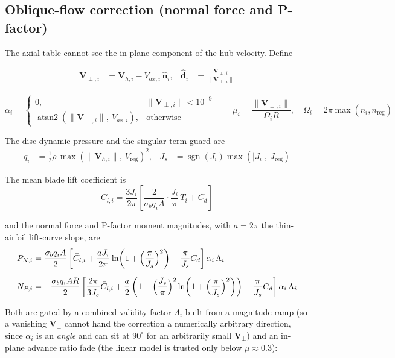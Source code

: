 \documentclass[11pt,a4paper]{article}
\newcommand{\vect}[1]{\bm{#1}}
\newcommand{\unit}[1]{\hat{\bm{#1}}}
\newcommand{\sgn}{\operatorname{sgn}}
\newcommand{\atantwo}{\operatorname{atan2}}
\begin{document}
\subsection{Oblique-flow correction (normal force and P-factor)}
The axial table cannot see the in-plane component of the hub velocity. Define

\begin{align}
\vect V_{\perp,i}&=\vect V_{h,i}-V_{ax,i}\,\unit n_i, &
\unit d_i&=\frac{\vect V_{\perp,i}}{\lVert\vect V_{\perp,i}\rVert}
\end{align}

\begin{equation}
\alpha_i=
\begin{cases}
0, & \lVert\vect V_{\perp,i}\rVert<10^{-9}\\[1mm]
\atantwo\!\left(\lVert\vect V_{\perp,i}\rVert,\ V_{ax,i}\right), & \text{otherwise}
\end{cases}
\qquad
\mu_i=\frac{\lVert\vect V_{\perp,i}\rVert}{\Omega_i R},
\quad \Omega_i=2\pi\max(n_i,n_{\mathrm{reg}})
\end{equation}

The disc dynamic pressure and the singular-term guard are
\begin{align}
q_i&=\tfrac12\rho\,\max\!\left(\lVert\vect V_{h,i}\rVert,\ V_{\!\mathrm{reg}}\right)^{2}, &
J_{s}&=\sgn(J_i)\max\!\left(|J_i|,\ J_{\mathrm{reg}}\right)
\end{align}

The mean blade lift coefficient is
\begin{equation}
\bar C_{l,i}=\frac{3J_i}{2\pi}
\left[\frac{2}{\sigma_b q_i A}\cdot\frac{J_i}{\pi}\,T_i+C_{d}\right]
\end{equation}

and the normal force and P-factor moment magnitudes, with $a=2\pi$ the
thin-airfoil lift-curve slope, are
\begin{align}
P_{N,i}&=\frac{\sigma_b q_i A}{2}
\left[\bar C_{l,i}
+\frac{a J_i}{2\pi}\ln\!\left(1+\Bigl(\frac{\pi}{J_{s}}\Bigr)^{2}\right)
+\frac{\pi}{J_{s}}C_{d}\right]\alpha_i\,\Lambda_i\\[2mm]
N_{P,i}&=-\frac{\sigma_b q_i A R}{2}
\left[\frac{2\pi}{3J_{s}}\bar C_{l,i}
+\frac{a}{2}\left(1-\Bigl(\frac{J_{s}}{\pi}\Bigr)^{2}
\ln\!\left(1+\Bigl(\frac{\pi}{J_{s}}\Bigr)^{2}\right)\right)
-\frac{\pi}{J_{s}}C_{d}\right]\alpha_i\,\Lambda_i
\end{align}

Both are gated by a combined validity factor $\Lambda_i$ built from a
magnitude ramp (so a vanishing $\vect V_\perp$ cannot hand the correction a
numerically arbitrary direction, since $\alpha_i$ is an \emph{angle} and can sit
at $90^\circ$ for an arbitrarily small $\vect V_\perp$) and an in-plane advance
ratio fade (the linear model is trusted only below $\mu\approx0.3$):
\end{document}
